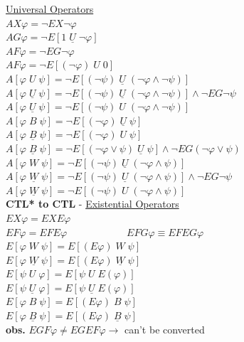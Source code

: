 \documentclass{article}
\begin{document}
\begin{multicols}{4}
\underline{Universal Operators} \\
$AX\varphi =  \neg EX \neg \varphi \qquad$ \\
$AG\varphi=  \neg E[1 \; \underline{U} \; \neg \varphi] $ \\
$AF\varphi =  \neg EG \neg \varphi $ \\
$AF\varphi =  \neg E[(\neg \varphi)\; U\; 0] $ \\
$A[\varphi \; U\; \psi]=  \neg E[(\neg \psi)\; \underline{U} \; (\neg \varphi \wedge \neg \psi)] $ \\
$A[\varphi \; \underline{U} \; \psi] =  \neg E[(\neg \psi) \; \underline{U}\; (\neg \varphi \wedge \neg \psi)]\wedge \neg EG \neg \psi$ \\
$A[\varphi \; \underline{U} \; \psi] =  \neg E[(\neg \psi) \; U\; (\neg \varphi \wedge \neg \psi)]$ \\
$A[\varphi \; B\; \psi]=  \neg E[(\neg \varphi)\; \underline{U} \; \psi] $ \\
$A[\varphi \; \underline{B}\; \psi]=  \neg E[(\neg \varphi)\; U \; \psi] $ \\
$A[\varphi \; \underline{B} \; \psi] =  \neg E[(\neg \varphi \vee \psi) \; \underline{U}\; \psi] \wedge \neg EG(\neg \varphi \vee \psi)$ \\
$A[\varphi \; W\; \psi]=  \neg E[(\neg \psi) \; \underline{U}\; (\neg \varphi \wedge \psi)]$ \\
$A[\varphi \; \underline{W} \; \psi] =  \neg E[(\neg \psi) \; \underline{U}\; (\neg \varphi \wedge \psi)] \wedge \neg EG\neg \psi $ \\
$A[\varphi \; \underline{W} \; \psi] =  \neg E[(\neg \psi) \; U\; (\neg \varphi \wedge \psi)]$\\

\textbf{CTL* to CTL} - \underline{Existential Operators}\\
$EX\varphi = EXE \varphi$\\
$EF\varphi = EFE\varphi\qquad \qquad \qquad EFG\varphi \equiv EFEG\varphi$\\
$E[\varphi\; W \; \psi]=E[(E\varphi)\; W \;\psi]$\\
$E[\varphi\; \underline{W} \; \psi]=E[(E\varphi)\; \underline{W} \;\psi]$\\
$E[\psi\; U \; \varphi]=E[\psi \; U \;E(\varphi)]$\\
$E[\psi\; \underline{U} \; \varphi]=E[\psi \; \underline{U} \;E(\varphi)]$\\
$E[\varphi\; B \; \psi]=E[(E\varphi)\; B \;\psi]$\\
$E[\varphi\; \underline{B} \; \psi]=E[(E\varphi)\; \underline{B} \;\psi]$\\
\textbf{obs.} $EGF\varphi \neq EGEF\varphi \rightarrow$ can't be converted\\ 


\end{multicols}
\end{document}
